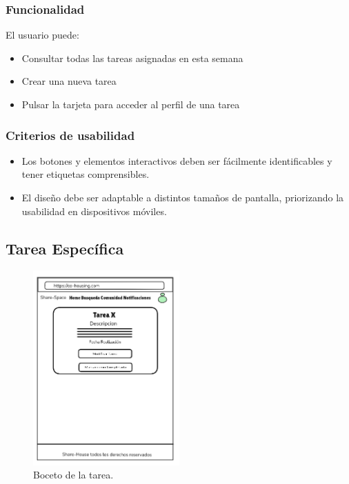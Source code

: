 \subsubsection{Funcionalidad}
El usuario puede:
\begin{itemize}
  \item Consultar todas las tareas asignadas en esta semana
  \item Crear una nueva tarea
  \item Pulsar la tarjeta para acceder al perfil de una tarea
\end{itemize}

\subsubsection{Criterios de usabilidad}
\begin{itemize}
  \item Los botones y elementos interactivos deben ser fácilmente identificables y tener etiquetas comprensibles.
  \item El diseño debe ser adaptable a distintos tamaños de pantalla, priorizando la usabilidad en dispositivos móviles.
\end{itemize}

\subsection{Tarea Específica}
\begin{figure}[H]
    \centering
    \includegraphics[width=0.5\textwidth]{fotos/Tarea-boceto.png}
    \caption{Boceto de la tarea.}
    \label{fig:home}
\end{figure}


